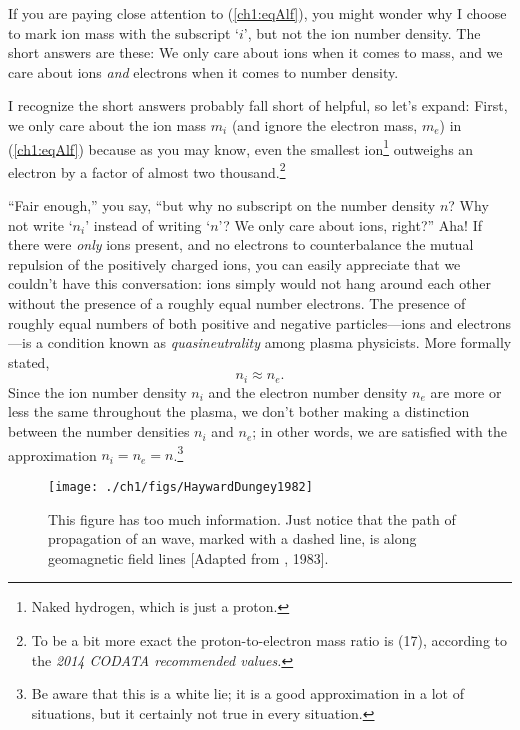 If you are paying close attention to (\ref{ch1:eqAlf}), you might wonder why I
choose to mark ion mass with the subscript `$i$', but not the ion number
density. The short answers are these: We only care about ions when it comes to
mass, and we care about ions \emph{and} electrons when it comes to number
density.

I recognize the short answers probably fall short of helpful, so let's expand:
First, we only care about the ion mass $m_i$ (and ignore the electron mass,
$m_e$) in (\ref{ch1:eqAlf}) because as you may know, even the smallest
ion\footnote{Naked hydrogen, which is just a proton.} outweighs an electron by a
factor of almost two thousand.\footnote{To be a bit more exact the
  proton-to-electron mass ratio is (17), according to
  the \textsl{2014 CODATA recommended values.}}

``Fair enough,'' you say, ``but why no subscript on the number density $n$?  Why
not write `$n_i$' instead of writing `$n$'? We only care about ions, right?''
Aha! If there were \emph{only} ions present, and no electrons to counterbalance
the mutual repulsion of the positively charged ions, you can easily appreciate
that we couldn't have this conversation: ions simply would not hang around each
other without the presence of a roughly equal number electrons. The presence of
roughly equal numbers of both positive and negative particles---ions and
electrons---is a condition known as \emph{quasineutrality} among plasma
physicists. More formally stated,
\begin{equation}
  \label{ch1:eqQuasi}
  n_i \approx n_e.
\end{equation}
Since the ion number density $n_i$ and the electron number density $n_e$ are
more or less the same throughout the plasma, we don't bother making a
distinction between the number densities $n_i$ and $n_e$; in other words, we are
satisfied with the approximation $n_i = n_e = n$.\footnote{Be aware that this
  is a white lie; it is a good approximation in a lot of situations, but it
  certainly not true in every situation.}



\begin{figure}
  \centering
  \noindent\texttt{[image: ./ch1/figs/HaywardDungey1982]}
  \caption[\Alf wave propagation]{This figure has too much information. Just
    notice that the path of propagation of an \Alf wave, marked with a dashed
    line, is along geomagnetic field lines [Adapted from
    \citeauthor{Hayward1983}, 1983].}
  \label{ch1:FigAlfProp}
\end{figure}

